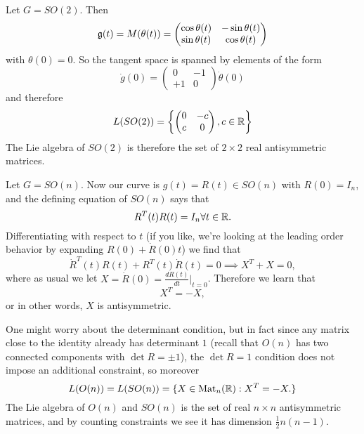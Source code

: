 \begin{exm}
Let $G=SO(2)$. Then 
$$\mathfrak{g}(t)=M(\theta(t))=\begin{pmatrix}
\cos\theta(t)&-\sin\theta(t)\\
\sin\theta(t)&\cos\theta(t)
\end{pmatrix}$$
with $\theta(0)=0$. So the tangent space is spanned by elements of the form
$$\dot g(0)=\begin{pmatrix}
0&-1\\
+1&0
\end{pmatrix} \dot\theta(0)$$
and therefore
$$L(SO(2))=\left\{\begin{pmatrix}
0&-c\\
c&0
\end{pmatrix}, c\in \mathbb{R}\right\}$$
The Lie algebra of $SO(2)$ is therefore the set of $2\times 2$ real antisymmetric matrices.
\end{exm}

\begin{exm}
Let $G=SO(n)$. Now our curve is $g(t)=R(t)\in SO(n)$ with $R(0)=I_n$, and the defining equation of $SO(n)$ says that
$$R^T (t)R(t)=I_n \forall t\in \mathbb{R}.$$
Differentiating with respect to $t$ (if you like, we're looking at the leading order behavior by expanding $R(0)+\dot R(0) t$) we find that
$$\dot R^T(t) R(t)+ R^T(t) \dot R(t)=0 \implies X^T +X=0,$$
where as usual we let $X=\dot R(0)=\frac{dR(t)}{dt}|_{t=0}$.
Therefore we learn that $$X^T=-X,$$
or in other words, $X$ is antisymmetric.

One might worry about the determinant condition, but in fact since any matrix close to the identity already has determinant $1$ (recall that $O(n)$ has two connected components with $\det R=\pm 1$), the $\det R=1$ condition does not impose an additional constraint, so moreover
$$L(O(n))=L(SO(n))= \{X\in \text{Mat}_n(\mathbb{R}): X^T = -X.\}$$
The Lie algebra of $O(n)$ and $SO(n)$ is the set of real $n\times n$ antisymmetric matrices, and by counting constraints we see it has dimension $\frac{1}{2}n(n-1)$.
\end{exm}

